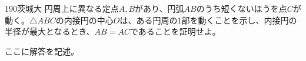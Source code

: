 \begin{thm}{190}{}{茨城大}
 円周上に異なる定点$A, B$があり、円弧$AB$のうち短くないほうを点$C$が動く。$\triangle{ABC}$の内接円の中心$O$は、ある円周の1部を動くことを示し、内接円の半径が最大となるとき、$AB=AC$であることを証明せよ。
\end{thm}

ここに解答を記述。